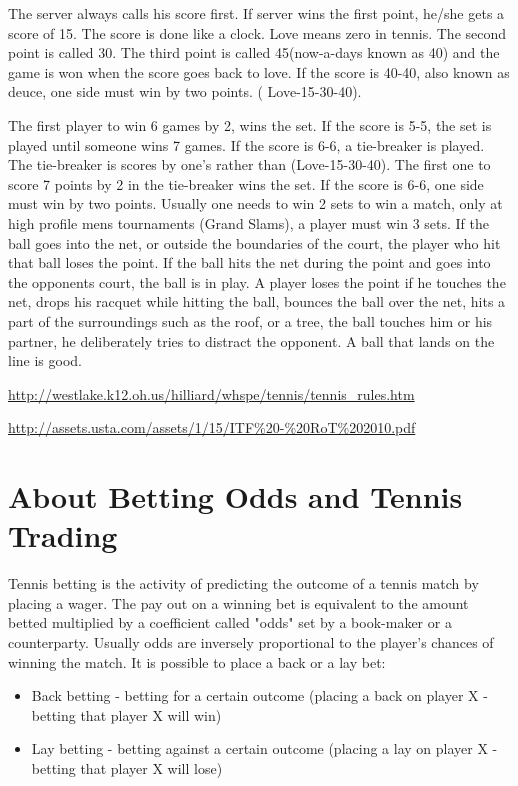 \documentclass[10pt]{report}
\begin{document}
The server always calls his score first. If server wins the first point, he/she gets a score of 15. The score is done like a clock. Love means zero in tennis.
The second point is called 30. The third point is called 45(now-a-days known as 40) and the game is won when the score goes back to love. If the score is 40-40, 
also known as deuce, one side must win by two points. ( Love-15-30-40).

The first player to win 6 games by 2, wins the set. If the score is 5-5, the set is played until someone wins 7 games. If the score is 6-6, a tie-breaker is played.
The tie-breaker is scores by one's rather than (Love-15-30-40). The first one to score 7 points by 2 in the tie-breaker wins the set. If the score is 6-6, one side must win
by two points. 
Usually one needs to win 2 sets to win a match, only at high profile mens tournaments (Grand Slams), a player must win 3 sets. 
If the ball goes into the net, or outside the boundaries of the court, the player who hit that ball loses the point. If the ball hits the net during the point and goes into the opponents court, the ball is in play. A player loses the point if he touches the net, drops his racquet while hitting the ball, bounces the ball over the net, hits a part of the surroundings such as the roof, or a tree, the ball touches him or his partner, he deliberately tries to distract the opponent.
A ball that lands on the line is good.

\url{http://westlake.k12.oh.us/hilliard/whspe/tennis/tennis_rules.htm}

\url{http://assets.usta.com/assets/1/15/ITF%20-%20RoT%202010.pdf}


\chapter{About Betting Odds and Tennis Trading}

Tennis betting is the activity of predicting the outcome of a tennis match by placing a wager.
The pay out on a winning bet is equivalent to the amount betted multiplied by a coefficient called "odds" set by a book-maker or a counterparty.
Usually odds are inversely proportional to the player's chances of winning the match.
It is possible to place a back or a lay bet:
\begin{itemize}
\item Back betting - betting for a certain outcome (placing a back on player X -
betting that player X will win)
\item Lay betting - betting against a certain outcome (placing a lay on player X -
betting that player X will lose)
\end{itemize}
\end{document}
